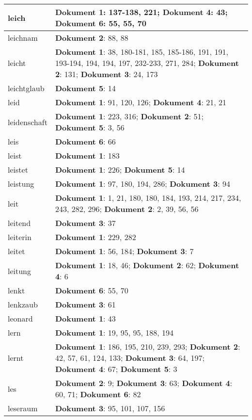 \documentclass[a5paper]{article}
\begin{document}
\begin{longtable}[l]{|l|p{3in}|}
\hline
leich & \textbf{Dokument 1}: 137-138, 221; \textbf{Dokument 4}: 43; \textbf{Dokument 6}: 55, 55, 70 \\
\hline
leichnam & \textbf{Dokument 2}: 88, 88 \\
\hline
leicht & \textbf{Dokument 1}: 38, 180-181, 185, 185-186, 191, 191, 193-194, 194, 194, 197, 232-233, 271, 284; \textbf{Dokument 2}: 131; \textbf{Dokument 3}: 24, 173 \\
\hline
leichtglaub & \textbf{Dokument 5}: 14 \\
\hline
leid & \textbf{Dokument 1}: 91, 120, 126; \textbf{Dokument 4}: 21, 21 \\
\hline
leidenschaft & \textbf{Dokument 1}: 223, 316; \textbf{Dokument 2}: 51; \textbf{Dokument 5}: 3, 56 \\
\hline
leis & \textbf{Dokument 6}: 66 \\
\hline
leist & \textbf{Dokument 1}: 183 \\
\hline
leistet & \textbf{Dokument 1}: 226; \textbf{Dokument 5}: 14 \\
\hline
leistung & \textbf{Dokument 1}: 97, 180, 194, 286; \textbf{Dokument 3}: 94 \\
\hline
leit & \textbf{Dokument 1}: 1, 21, 180, 180, 184, 193, 214, 217, 234, 243, 282, 296; \textbf{Dokument 2}: 2, 39, 56, 56 \\
\hline
leitend & \textbf{Dokument 3}: 37 \\
\hline
leiterin & \textbf{Dokument 1}: 229, 282 \\
\hline
leitet & \textbf{Dokument 1}: 56, 184; \textbf{Dokument 3}: 7 \\
\hline
leitung & \textbf{Dokument 1}: 18, 46; \textbf{Dokument 2}: 62; \textbf{Dokument 4}: 6 \\
\hline
lenkt & \textbf{Dokument 6}: 55, 70 \\
\hline
lenkzaub & \textbf{Dokument 3}: 61 \\
\hline
leonard & \textbf{Dokument 1}: 43 \\
\hline
lern & \textbf{Dokument 1}: 19, 95, 95, 188, 194 \\
\hline
lernt & \textbf{Dokument 1}: 186, 195, 210, 239, 293; \textbf{Dokument 2}: 42, 57, 61, 124, 133; \textbf{Dokument 3}: 64, 197; \textbf{Dokument 4}: 67; \textbf{Dokument 5}: 3 \\
\hline
les & \textbf{Dokument 2}: 9; \textbf{Dokument 3}: 63; \textbf{Dokument 4}: 60, 71; \textbf{Dokument 6}: 82 \\
\hline
leseraum & \textbf{Dokument 3}: 95, 101, 107, 156 \\

\end{longtable}
\end{document}
